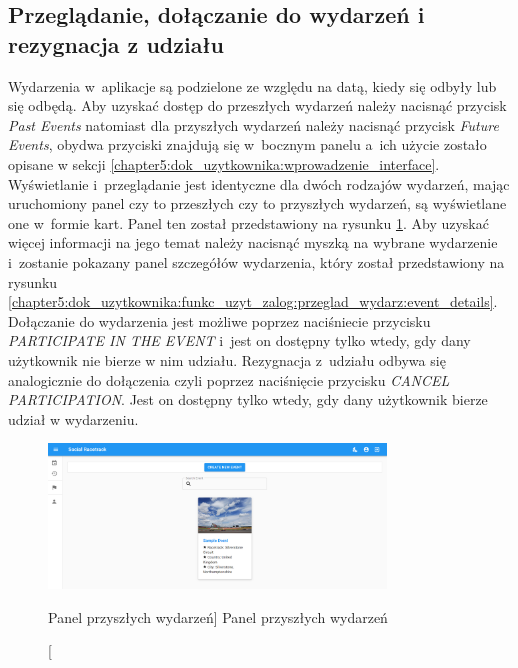 \documentclass[../Kamil_Kowalewski_Main.tex]{subfiles}
\begin{document}
{{        \subsection{Przeglądanie, dołączanie do wydarzeń i rezygnacja z udziału}
        \label{chapter5:dok_uzytkownika:funkc_uzyt_zalog:przeglad_wydarz} {
            Wydarzenia w~aplikacje są podzielone ze względu na datą, kiedy się odbyły
            lub się odbędą. Aby uzyskać dostęp do przeszłych wydarzeń należy nacisnąć
            przycisk \textit{Past Events} natomiast dla przyszłych wydarzeń należy
            nacisnąć przycisk \textit{Future Events}, obydwa przyciski znajdują się
            w~bocznym panelu a~ich użycie zostało opisane w sekcji
            \ref{chapter5:dok_uzytkownika:wprowadzenie_interface}. Wyświetlanie
            i~przeglądanie jest identyczne dla dwóch rodzajów wydarzeń, mając uruchomiony
            panel czy to przeszłych czy to przyszłych wydarzeń, są wyświetlane one
            w~formie kart. Panel ten został przedstawiony na rysunku
            \ref{chapter5:dok_uzytkownika:funkc_uzyt_zalog:przeglad_wydarz:future_events_panel}.
            Aby uzyskać więcej informacji na jego temat należy nacisnąć myszką na
            wybrane wydarzenie i~zostanie pokazany panel szczegółów wydarzenia, który
            został przedstawiony na rysunku
            \ref{chapter5:dok_uzytkownika:funkc_uzyt_zalog:przeglad_wydarz:event_details}.
            Dołączanie do wydarzenia jest możliwe poprzez naciśniecie przycisku
            \textit{PARTICIPATE IN THE EVENT} i~jest on dostępny tylko wtedy, gdy dany
            użytkownik nie bierze w nim udziału. Rezygnacja z~udziału odbywa się
            analogicznie do dołączenia czyli poprzez naciśnięcie przycisku
            \textit{CANCEL PARTICIPATION}. Jest on dostępny tylko wtedy, gdy dany
            użytkownik bierze udział w wydarzeniu.

            \begin{figure}[H]
                \centering
                \includegraphics[width=0.8\textwidth, keepaspectratio]
                {img/chapter5/loggedin/future_event_panel.png}
                \caption
                [Panel przyszłych wydarzeń]
                {Panel przyszłych wydarzeń}
                \label{chapter5:dok_uzytkownika:funkc_uzyt_zalog:przeglad_wydarz:future_events_panel}
            \end{figure}

}}}
\end{document}
